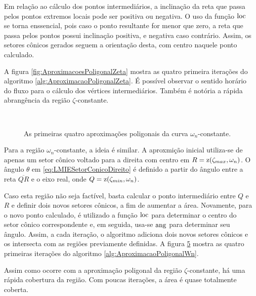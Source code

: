 Em relação ao cálculo dos pontos intermediários, a inclinação da reta que passa pelos pontos extremos locais pode ser positiva ou negativa. O uso da função $\operatorname{loc}$ se torna enssencial, pois caso o ponto resultante for menor que zero, a reta que passa pelos pontos possui inclinação positiva, e negativa caso contrário\cite{WISNIEWSKI2019}. Assim, os setores cônicos gerados seguem a orientação desta, com centro naquele ponto calculado.

A figura \ref{fig:AproximacoesPoligonalZeta} mostra as quatro primeira iterações do algoritmo \ref{alg:AproximacaoPoligonalZeta}. É possível observar o sentido horário do fluxo para o cálculo dos vértices intermediários. Também é notória a rápida abrangência da região $\zeta$-constante.

\begin{figure}[!hb]
  \centering
  \begin{subfigure}[t]{0.4\columnwidth}
      
      \caption{}
      \label{subfig:AproximacaoPoligonalWn1}
  \end{subfigure}
  \begin{subfigure}[t]{0.4\columnwidth}
      
      \caption{}
      \label{subfig:AproximacaoPoligonalWn2}
  \end{subfigure}
  \\
  \begin{subfigure}[t]{0.4\columnwidth}
    
    \caption{}
    \label{subfig:AproximacaoPoligonalWn3}
  \end{subfigure}
  \begin{subfigure}[t]{0.4\columnwidth}
    
    \caption{}
    \label{subfig:AproximacaoPoligonalWn4}
  \end{subfigure}
  \caption{As primeiras quatro aproximações poligonais da curva $\omega_n$-constante.}
  \label{fig:AproximacoesPoligonalWn}
\end{figure}

Para a região $\omega_n$-constante, a ideia é similar. A aproxmição inicial utiliza-se de apenas um setor cônico voltado para a direita com centro em $R = \operatorname{\mathrm{z}}(\zeta_{max},\omega_n)$. O ângulo $\theta$ em \eqref{eq:LMIESetorConicoDireito} é definido a partir do ângulo entre a reta $\overline{QR}$ e o eixo real, onde $Q = \operatorname{\mathrm{z}}(\zeta_{min},\omega_n)$.

Caso esta região não seja factível, basta calcular o ponto intermediário entre $Q$ e $R$ e definir dois novos setores cônicos, a fim de aumentar a área. Novamente, para o novo ponto calculado, é utilizado a função $\operatorname{loc}$ para determinar o centro do setor cônico correspondente e, em seguida, usa-se $\operatorname{ang}$ para determinar seu ângulo. Assim, a cada iteração, o algoritmo adiciona dois novos setores cônicos e os intersecta com as regiões previamente definidas. A figura \ref{fig:AproximacoesPoligonalWn} mostra as quatro primeiras iterações do algoritmo \ref{alg:AproximacaoPoligonalWn}.

Assim como ocorre com a aproximação poligonal da região $\zeta$-constante, há uma rápida cobertura da região. Com poucas iterações, a área é quase totalmente coberta.